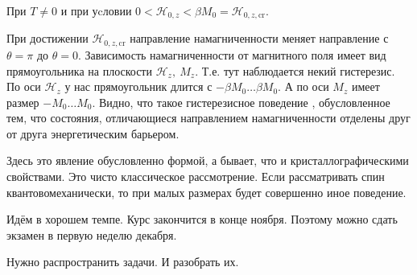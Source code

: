\documentclass[a4paper, 14pt, russian]{article}
\begin{document}
	При  $T \neq 0$  и при уcловии 
	$0 < \mathcal{H}_{0,z} < \beta M_0 = \mathcal{H}_{0,z,\text{cr}}$.

	При достижении $\mathcal{H}_{0,z,\text{cr}}$ направление намагниченности меняет направление
	с $\theta = \pi$ до $\theta  = 0$. Зависимость намагниченности от магнитного поля имеет вид
	прямоугольника на плоскости $\mathcal{H}_{z},~M_z$. Т.е. тут наблюдается некий гистерезис.
	По оси $\mathcal{H}_z$ у нас прямоугольник длится с $-\beta M_0 \hdots \beta M_0$.
	А по оси $M_z$ имеет размер $-M_0 \hdots M_0$. Видно, что такое гистерезисное поведение
	, обусловленное тем, что состояния, отличающиеся направлением намагниченности отделены друг
	от друга энергетическим барьером.

	Здесь это явление обусловленно формой, а бывает, что и кристаллографическими свойствами.
	Это чисто классическое рассмотрение. Если рассматривать спин квантовомеханически, 
	то при малых размерах будет совершенно иное поведение.

	\begin{tcolorbox}
		Идём в хорошем темпе. Курс закончится в конце ноября. Поэтому можно сдать экзамен 
		в первую неделю декабря. 

		Нужно распространить задачи. И разобрать их.
	\end{tcolorbox}
\end{document}
